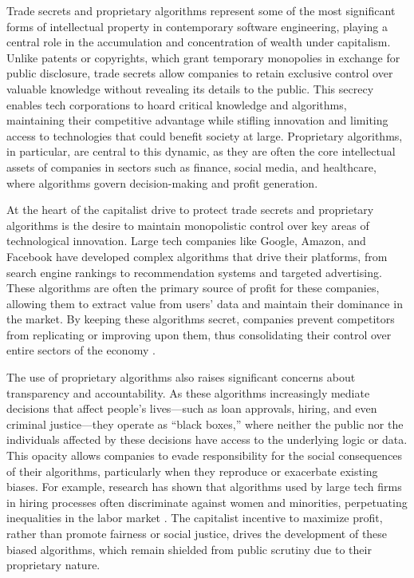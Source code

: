 \begin{refsection}
Trade secrets and proprietary algorithms represent some of the most significant forms of intellectual property in contemporary software engineering, playing a central role in the accumulation and concentration of wealth under capitalism. Unlike patents or copyrights, which grant temporary monopolies in exchange for public disclosure, trade secrets allow companies to retain exclusive control over valuable knowledge without revealing its details to the public. This secrecy enables tech corporations to hoard critical knowledge and algorithms, maintaining their competitive advantage while stifling innovation and limiting access to technologies that could benefit society at large. Proprietary algorithms, in particular, are central to this dynamic, as they are often the core intellectual assets of companies in sectors such as finance, social media, and healthcare, where algorithms govern decision-making and profit generation.

At the heart of the capitalist drive to protect trade secrets and proprietary algorithms is the desire to maintain monopolistic control over key areas of technological innovation. Large tech companies like Google, Amazon, and Facebook have developed complex algorithms that drive their platforms, from search engine rankings to recommendation systems and targeted advertising. These algorithms are often the primary source of profit for these companies, allowing them to extract value from users’ data and maintain their dominance in the market. By keeping these algorithms secret, companies prevent competitors from replicating or improving upon them, thus consolidating their control over entire sectors of the economy \cite[pp.~88-90]{pasquale2015}.

The use of proprietary algorithms also raises significant concerns about transparency and accountability. As these algorithms increasingly mediate decisions that affect people’s lives—such as loan approvals, hiring, and even criminal justice—they operate as “black boxes,” where neither the public nor the individuals affected by these decisions have access to the underlying logic or data. This opacity allows companies to evade responsibility for the social consequences of their algorithms, particularly when they reproduce or exacerbate existing biases. For example, research has shown that algorithms used by large tech firms in hiring processes often discriminate against women and minorities, perpetuating inequalities in the labor market \cite[pp.~123-126]{eubanks2018}. The capitalist incentive to maximize profit, rather than promote fairness or social justice, drives the development of these biased algorithms, which remain shielded from public scrutiny due to their proprietary nature.


\end{refsection}
